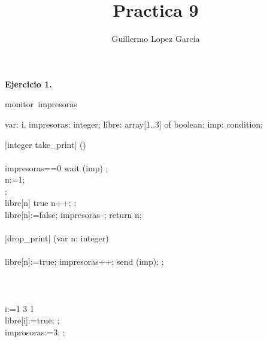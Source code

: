 \documentclass[]{article}
\title{Practica 9}
\author{Guillermo Lopez Garcia}
\begin{document}
\maketitle

\textbf{Ejercicio 1.}

\begin{program} %
\mbox{monitor impresoras} %

var:
i, impresoras: integer;
libre: array[1..3] of boolean;
imp: condition;

\PROC|integer take_print| () \BODY\\ %

\BEGIN\\
\DO{}
\IF{} impresoras==0 \THEN{} wait (imp) \FI;\\
n:=1;\\
\OD;\\

\WHILE{} libre[n] \neq{} true \DO{}
n++;
\OD;\\

libre[n]:=false;
impresoras--;
return n;
\END\\

\ENDPROC\\

\PROC|drop_print| (var n: integer) \BODY\\ %

\BEGIN\\
\DO{}
libre[n]:=true;
impresoras++;
send (imp);
\OD;\\
\END\\

\ENDPROC\\

\BEGIN\\ %
\DO{}
  \FOR{} i:=1 \TO{} 3 \STEP{} 1 \DO\\
     libre[i]:=true;
  \OD;\\
  improsoras:=3;
\OD;\\
\END\\

\end{program}

\end{document}
